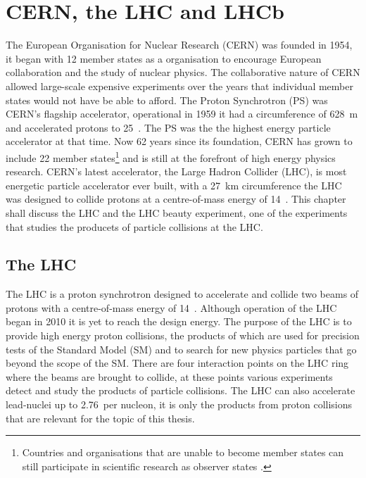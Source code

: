 \chapter{CERN, the LHC and LHCb}
\label{CERN_LHC_LHCb}

The European Organisation for Nuclear Research (CERN) was founded in 1954, it began with 12 member states as a organisation to encourage European collaboration and the study of nuclear physics. The collaborative nature of CERN allowed large-scale expensive experiments over the years that individual member states would not have be able to afford. The Proton Synchrotron (PS) was CERN's flagship accelerator, operational in 1959 it had a circumference of 628~m and accelerated protons to 25~\gev. The PS was the the highest energy particle accelerator at that time. Now 62 years since its foundation, CERN has grown to include 22 member states\footnote{Countries and organisations that are unable to become member states can still participate in scientific research as observer states \cite{Member_States}.} and is still at the forefront of high energy physics research. CERN’s latest accelerator, the Large Hadron Collider (LHC), is most energetic particle accelerator ever built, with a 27~km circumference the LHC was designed to collide protons at a centre-of-mass energy of 14~\tev. This chapter shall discuss the LHC and the LHC beauty experiment, one of the experiments that studies the producets of particle collisions at the LHC.

\section{The LHC}
\label{LHC}


The LHC is a proton synchrotron designed to accelerate and collide two beams of protons with a centre-of-mass energy of 14~\tev. Although operation of the LHC began in 2010 it is yet to reach the design energy. The purpose of the LHC is to provide high energy proton collisions, the products of which are used for precision tests of the Standard Model (SM) and to search for new physics particles that go beyond the scope of the SM. There are four interaction points on the LHC ring where the beams are brought to collide, at these points various experiments detect and study the products of particle collisions. The LHC can also accelerate lead-nuclei up to 2.76~\tev per nucleon, it is only the products from proton collisions that are relevant for the topic of this thesis.

